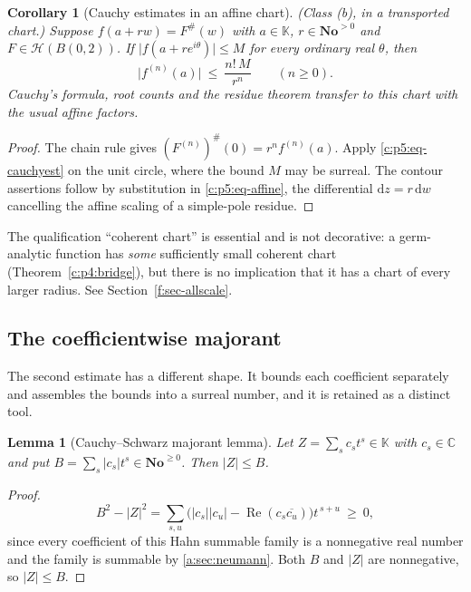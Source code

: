 \documentclass[11pt,a4paper]{article}
\numberwithin{equation}{section}
\newtheorem{lemma}[theorem]{Lemma}
\newtheorem{corollary}[theorem]{Corollary}
\theoremstyle{definition}
\theoremstyle{remark}
\theoremstyle{plain}
\newcommand{\K}{\mathbb K}
\newcommand{\No}{\mathbf{No}}
\newcommand{\CC}{\mathbb C}
\newcommand{\tm}{t}
\newcommand{\ev}[1]{#1^{\#}}
\newcommand{\Hc}{\mathcal H}
\newcommand{\abs}[1]{\lvert #1\rvert}
\newcommand{\dd}{\mathrm d}
\begin{document}
\begin{corollary}[Cauchy estimates in an affine chart]
\label{c:p5:scaledCauchy}
\emph{(Class (b), in a transported chart.)} Suppose $f(a+rw)=\ev F(w)$
with $a\in\K$, $r\in\No^{>0}$ and $F\in\Hc(B(0,2))$. If
$\abs{f(a+re^{i\theta})}\le M$ for every ordinary real $\theta$, then
\begin{equation}\label{c:p5:eq-scaledCauchy}
 \abs{f^{(n)}(a)}\ \le\ \frac{n!\,M}{r^{n}}\qquad(n\ge0).
\end{equation}
Cauchy's formula, root counts and the residue theorem transfer to this
chart with the usual affine factors.
\end{corollary}

\begin{proof}
The chain rule gives $\ev{(F^{(n)})}(0)=r^{n}f^{(n)}(a)$. Apply
\eqref{c:p5:eq-cauchyest} on the unit circle, where the bound $M$ may be
surreal. The contour assertions follow by substitution in
\eqref{c:p5:eq-affine}, the differential $\dd z=r\,\dd w$ cancelling the
affine scaling of a simple-pole residue.
\end{proof}

The qualification ``coherent chart'' is essential and is not decorative:
a germ-analytic function has \emph{some} sufficiently small coherent
chart (Theorem~\ref{c:p4:bridge}), but there is no implication that it
has a chart of every larger radius. See Section~\ref{f:sec-allscale}.

\subsection{The coefficientwise majorant}
\label{c:p5:majorantsec}

The second estimate has a different shape. It bounds each coefficient
separately and assembles the bounds into a surreal number, and it is
retained as a distinct tool.

\begin{lemma}[Cauchy--Schwarz majorant lemma]\label{c:p5:csmajorant}
Let $Z=\sum_{s}c_s\tm^{s}\in\K$ with $c_s\in\CC$ and put
$B=\sum_{s}\abs{c_s}\tm^{s}\in\No^{\ge0}$. Then $\abs Z\le B$.
\end{lemma}

\begin{proof}
\[
 B^{2}-\abs Z^{2}
 =\sum_{s,u}\bigl(\abs{c_s}\abs{c_u}
   -\operatorname{Re}(c_s\overline{c_u})\bigr)\tm^{\,s+u}\ \ge\ 0,
\]
since every coefficient of this Hahn summable family is a nonnegative
real number and the family is summable by \ref{a:sec:neumann}. Both $B$
and $\abs Z$ are nonnegative, so $\abs Z\le B$.
\end{proof}
\end{document}
